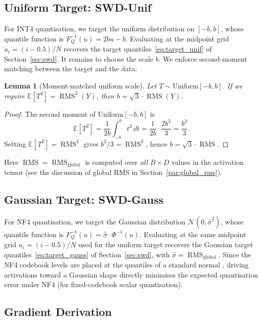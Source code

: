 \documentclass[11pt,a4paper]{article}
\newtheorem{lemma}[theorem]{Lemma}
\DeclareMathOperator{\RMS}{RMS}
\begin{document}
\subsection{Uniform Target: SWD-Unif}

For INT4 quantisation, we target the uniform distribution on $[-b, b]$, whose quantile function is $F_Q^{-1}(u) = 2bu - b$.
Evaluating at the midpoint grid $u_i = (i - 0.5)/N$ recovers the target quantiles~\eqref{eq:target_unif} of Section~\ref{sec:swd}.
It remains to choose the scale $b$.
We enforce second-moment matching between the target and the data:

\begin{lemma}[Moment-matched uniform scale]
\label{lem:b_moment_match}
Let $T \sim \mathrm{Uniform}[-b, b]$.
If we require $\mathbb{E}[T^2] = \RMS^2(Y)$, then $b = \sqrt{3} \cdot \RMS(Y)$.
\end{lemma}

\begin{proof}
The second moment of $\mathrm{Uniform}[-b, b]$ is
\[
\mathbb{E}[T^2] = \frac{1}{2b}\int_{-b}^{b} t^2 \, dt = \frac{1}{2b} \cdot \frac{2b^3}{3} = \frac{b^2}{3}.
\]
Setting $\mathbb{E}[T^2] = \RMS^2$ gives $b^2/3 = \RMS^2$, hence $b = \sqrt{3} \cdot \RMS$.
\end{proof}

\noindent
Here $\RMS = \RMS_{\text{global}}$ is computed over \emph{all} $B \times D$ values in the activation tensor (see the discussion of global RMS in Section~\ref{par:global_rms}).

\subsection{Gaussian Target: SWD-Gauss}

For NF4 quantisation, we target the Gaussian distribution $\mathcal{N}(0, \hat{\sigma}^2)$, whose quantile function is $F_Q^{-1}(u) = \hat{\sigma} \cdot \Phi^{-1}(u)$.
Evaluating at the same midpoint grid $u_i = (i - 0.5)/N$ used for the uniform target recovers the Gaussian target quantiles~\eqref{eq:target_gauss} of Section~\ref{sec:swd}, with $\hat{\sigma} = \RMS_{\text{global}}$.
Since the NF4 codebook levels are placed at the quantiles of a standard normal \cite{qlora}, driving activations toward a Gaussian shape directly minimises the expected quantisation error under NF4 (for fixed-codebook scalar quantisation).

\subsection{Gradient Derivation}
\label{app:swd_gradient}
\end{document}
